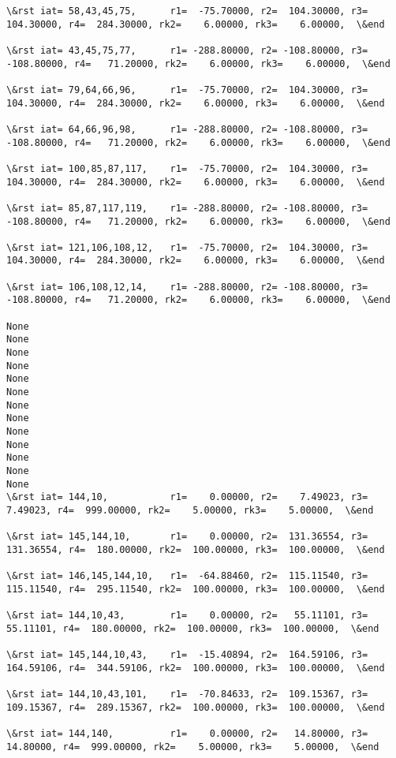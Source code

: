 \documentclass[11pt]{article}
\begin{document}
\begin{Verbatim}[commandchars=\\\{\}]
\&rst iat= 58,43,45,75,      r1=  -75.70000, r2=  104.30000, r3=  104.30000, r4=  284.30000, rk2=    6.00000, rk3=    6.00000,  \&end

\&rst iat= 43,45,75,77,      r1= -288.80000, r2= -108.80000, r3= -108.80000, r4=   71.20000, rk2=    6.00000, rk3=    6.00000,  \&end

\&rst iat= 79,64,66,96,      r1=  -75.70000, r2=  104.30000, r3=  104.30000, r4=  284.30000, rk2=    6.00000, rk3=    6.00000,  \&end

\&rst iat= 64,66,96,98,      r1= -288.80000, r2= -108.80000, r3= -108.80000, r4=   71.20000, rk2=    6.00000, rk3=    6.00000,  \&end

\&rst iat= 100,85,87,117,    r1=  -75.70000, r2=  104.30000, r3=  104.30000, r4=  284.30000, rk2=    6.00000, rk3=    6.00000,  \&end

\&rst iat= 85,87,117,119,    r1= -288.80000, r2= -108.80000, r3= -108.80000, r4=   71.20000, rk2=    6.00000, rk3=    6.00000,  \&end

\&rst iat= 121,106,108,12,   r1=  -75.70000, r2=  104.30000, r3=  104.30000, r4=  284.30000, rk2=    6.00000, rk3=    6.00000,  \&end

\&rst iat= 106,108,12,14,    r1= -288.80000, r2= -108.80000, r3= -108.80000, r4=   71.20000, rk2=    6.00000, rk3=    6.00000,  \&end

None
None
None
None
None
None
None
None
None
None
None
None
None
\&rst iat= 144,10,           r1=    0.00000, r2=    7.49023, r3=    7.49023, r4=  999.00000, rk2=    5.00000, rk3=    5.00000,  \&end

\&rst iat= 145,144,10,       r1=    0.00000, r2=  131.36554, r3=  131.36554, r4=  180.00000, rk2=  100.00000, rk3=  100.00000,  \&end

\&rst iat= 146,145,144,10,   r1=  -64.88460, r2=  115.11540, r3=  115.11540, r4=  295.11540, rk2=  100.00000, rk3=  100.00000,  \&end

\&rst iat= 144,10,43,        r1=    0.00000, r2=   55.11101, r3=   55.11101, r4=  180.00000, rk2=  100.00000, rk3=  100.00000,  \&end

\&rst iat= 145,144,10,43,    r1=  -15.40894, r2=  164.59106, r3=  164.59106, r4=  344.59106, rk2=  100.00000, rk3=  100.00000,  \&end

\&rst iat= 144,10,43,101,    r1=  -70.84633, r2=  109.15367, r3=  109.15367, r4=  289.15367, rk2=  100.00000, rk3=  100.00000,  \&end

\&rst iat= 144,140,          r1=    0.00000, r2=   14.80000, r3=   14.80000, r4=  999.00000, rk2=    5.00000, rk3=    5.00000,  \&end


\end{Verbatim}
\end{document}
